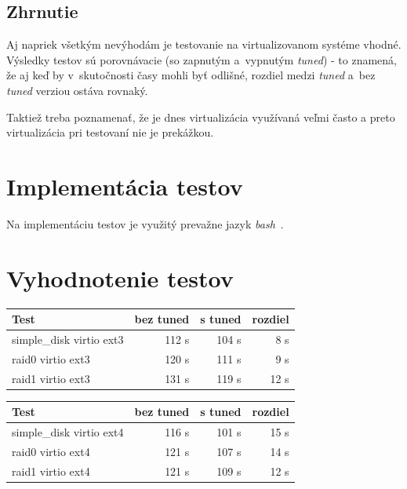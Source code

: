 \subsection{Zhrnutie}

Aj napriek všetkým nevýhodám je testovanie na virtualizovanom systéme vhodné.
Výsledky testov sú porovnávacie (so zapnutým a~vypnutým \emph{tuned}) - to
znamená, že aj keď by v~skutočnosti časy mohli byť odlišné, rozdiel medzi
\emph{tuned} a~bez \emph{tuned} verziou ostáva rovnaký.

Taktiež treba poznamenať, že je dnes virtualizácia využívaná veľmi často a
preto virtualizácia pri testovaní nie je prekážkou.

%
%

\section{Implementácia testov}

Na implementáciu testov je využitý prevažne jazyk \emph{bash}~\cite{bash}. 

%
%

\section{Vyhodnotenie testov}

\begin{center}
\begin{tabular}{|l|r|r|r|}
    \hline
    \textbf{Test} & \textbf{bez tuned} & \textbf{s tuned} & \textbf{rozdiel} \\ \hline
    simple\_disk virtio ext3 & 112 s & 104 s & 8 s \\
    \hline
    raid0 virtio ext3 & 120 s & 111 s & 9 s \\
    \hline
    raid1 virtio ext3 & 131 s & 119 s & 12 s \\
    \hline
\end{tabular}
\end{center}

\begin{center}
\begin{tabular}{|l|r|r|r|}
    \hline
    \textbf{Test} & \textbf{bez tuned} & \textbf{s tuned} & \textbf{rozdiel} \\ \hline
    simple\_disk virtio ext4 & 116 s & 101 s & 15 s \\
    \hline
    raid0 virtio ext4 & 121 s & 107 s & 14 s \\
    \hline
    raid1 virtio ext4 & 121 s & 109 s & 12 s \\
    \hline
\end{tabular}
\end{center}

